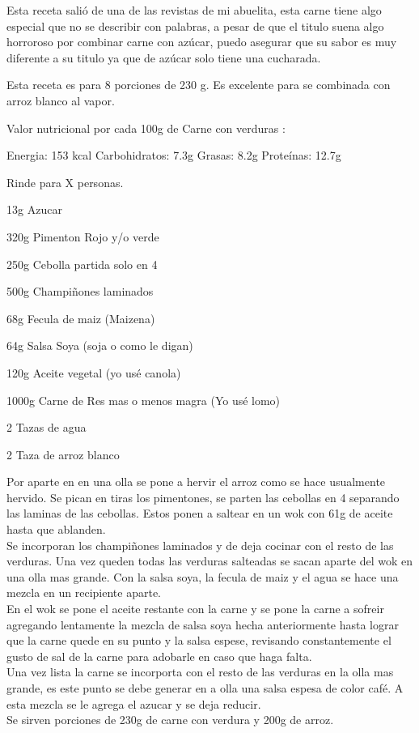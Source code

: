 Esta receta salió de una de las revistas de mi abuelita, esta carne tiene algo especial que no se describir con palabras, a pesar de que el titulo suena algo horroroso por combinar carne con azúcar, puedo asegurar que su sabor es muy diferente a su titulo ya que de azúcar solo tiene una cucharada.

Esta receta es para 8 porciones de 230 g. Es excelente para se combinada con arroz blanco al vapor.

Valor nutricional por cada 100g de Carne con verduras :
\begin{itemize}
Energia: 153 kcal
Carbohidratos: 7.3g
Grasas: 8.2g
Proteínas: 12.7g
\end{itemize}

Rinde para X personas.

\begin{ingredientes}
\item 13g Azucar
\item 320g Pimenton Rojo y/o verde
\item 250g Cebolla partida solo en 4
\item 500g Champiñones laminados
\item 68g Fecula de maiz (Maizena)
\item 64g Salsa Soya (soja o como le digan)
\item 120g Aceite vegetal (yo usé canola)
\item 1000g Carne de Res mas o menos magra (Yo usé lomo)
\item 2 Tazas de agua
\item 2 Taza de arroz blanco
\end{ingredientes}
\preparacion
Por aparte en en una olla se pone a hervir el arroz como se hace usualmente hervido. Se pican en tiras los pimentones, se parten las cebollas en 4 separando las laminas de las cebollas. Estos ponen a saltear en un wok con 61g de aceite hasta que ablanden.\\

Se incorporan los champiñones laminados y de deja cocinar con el resto de las verduras. Una vez queden todas las verduras salteadas se sacan aparte del wok en una olla mas grande. Con la salsa soya, la fecula de maiz y el agua se hace una mezcla en un recipiente aparte.\\

En el wok se pone el aceite restante con la carne y se pone la carne a sofreir agregando lentamente la mezcla de salsa soya hecha anteriormente hasta lograr que la carne quede en su punto y la salsa espese, revisando constantemente el gusto de sal de la carne para adobarle en caso que haga falta.\\

Una vez lista la carne se incorporta con el resto de las verduras en la olla mas grande, es este punto se debe generar en a olla una salsa espesa de color café. A esta mezcla se le agrega el azucar y se deja reducir.\\

Se sirven porciones de 230g de carne con verdura y 200g de arroz.